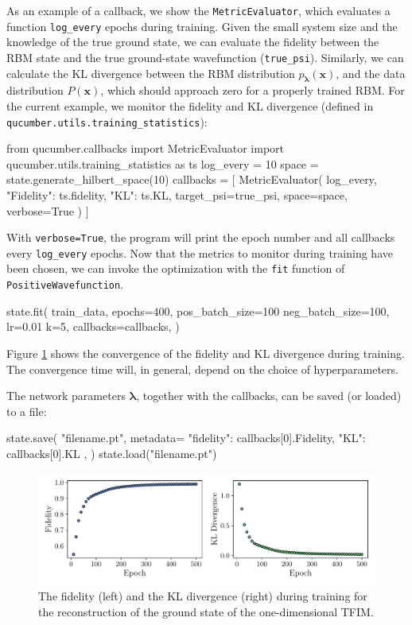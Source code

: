 \documentclass[submission, Phys, hidelnks]{SciPost}
\begin{document}
As an example of a callback, we show the \verb|MetricEvaluator|, which evaluates a function \verb|log_every| epochs during training. Given the small system size and the knowledge of the true ground state, we can evaluate the fidelity between the RBM state and the true ground-state wavefunction (\verb|true_psi|). Similarly, we can calculate the KL divergence between the RBM distribution $p_{\bm{\lambda}}(\bm{x})$, and the data distribution $P(\bm{x})$, which should approach zero for a properly trained RBM. For the current example, we monitor the fidelity and KL divergence (defined in \verb|qucumber.utils.training_statistics|):
\begin{python}
from qucumber.callbacks import MetricEvaluator
import qucumber.utils.training_statistics as ts
log_every = 10
space = state.generate_hilbert_space(10)
callbacks = [
    MetricEvaluator(
        log_every,
        {"Fidelity": ts.fidelity, "KL": ts.KL},
    target_psi=true_psi,
    space=space,
    verbose=True
    )
]
\end{python}
With \verb|verbose=True|, the program will print the epoch number and all callbacks every \verb|log_every| epochs. Now that the metrics to monitor during training have been chosen, we can invoke the optimization with the \verb|fit| function of \verb|PositiveWavefunction|.
\begin{python}
state.fit(
    train_data,
    epochs=400,
    pos_batch_size=100
    neg_batch_size=100,
    lr=0.01
    k=5,
    callbacks=callbacks,
)
\end{python}

Figure \ref{fig:KL} shows the convergence of the fidelity and KL divergence during training. The convergence time will, in general, depend on the choice of hyperparameters.

The network parameters $\bm{\lambda}$, together with the callbacks, can be saved (or loaded) to a file:
\begin{python}
state.save(
    "filename.pt",
    metadata={
        "fidelity": callbacks[0].Fidelity,
        "KL": callbacks[0].KL
    },
)
state.load("filename.pt")
\end{python}

\begin{figure}[hbt]
    \centering{}
    \includegraphics[width=\columnwidth, trim={0 15 0 0}, clip]{fid_KL.pdf}
    \caption{\label{fig:KL} The fidelity (left) and the KL divergence (right) during training for the reconstruction of the ground state of the one-dimensional TFIM.}
\end{figure}
\end{document}
